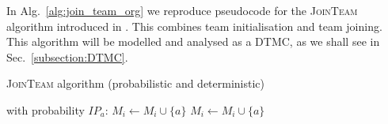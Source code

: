 \documentclass{llncs}
\newcommand{\comment}[1]{\marginpar{\footnotesize \color{red} \textsf{#1}}}
\begin{document}


In Alg.~\ref{alg:join_team_org} we reproduce pseudocode for the \textsc{JoinTeam} algorithm introduced in \cite{gaston2005agent}. This combines team initialisation and team joining. %
This algorithm will be modelled and analysed as a DTMC, as we shall see in Sec.~\ref{subsection:DTMC}.

\begin{algorithm}[h]
\caption{\textsc{JoinTeam} algorithm \cite{gaston2005agent} (probabilistic and deterministic)}
\label{alg:join_team_org}
\begin{scriptsize}
\begin{algorithmic}
     
       
	 
	  \State with probability $IP_a$: $M_i \leftarrow M_i \cup \{a\}$ 
	\EndIf
       
	 
	  \State $M_i \leftarrow M_i \cup \{a\}$ 
	\EndIf
      \EndIf
    \EndIf
  \EndFor
\EndProcedure
\end{algorithmic}
\end{scriptsize}
\end{algorithm}
%
\end{document}
